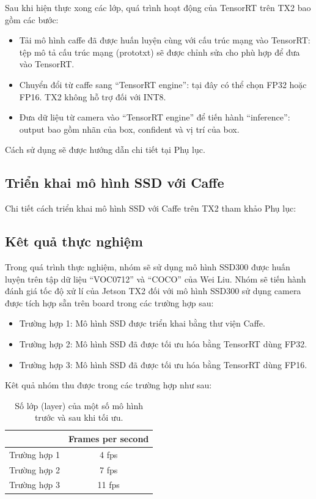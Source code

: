 \documentclass[a4paper]{report}
\begin{document}
Sau khi hiện thực xong các lớp, quá trình hoạt động của TensorRT trên TX2 bao gồm các bước:
\begin{itemize}
	\item Tải mô hình caffe đã được huấn luyện cùng với cấu trúc mạng vào TensorRT: tệp mô tả cấu trúc mạng (prototxt) sẽ được chỉnh sửa cho phù hợp để đưa vào TensorRT. 
	\item Chuyển đổi từ caffe sang “TensorRT engine”: tại đây có thể chọn FP32 hoặc FP16. TX2 không hỗ trợ đối với INT8.
	\item Đưa dữ liệu từ camera vào “TensorRT engine” để tiến hành “inference”: output bao gồm nhãn của box, confident và vị trí của box.
\end{itemize}

Cách sử dụng sẽ được hướng dẫn chi tiết tại Phụ lục.
\subsection{Triển khai mô hình SSD với Caffe}
Chi tiết cách triển khai mô hình SSD với Caffe trên TX2 tham khảo Phụ lục:
\subsection{Kêt quả thực nghiệm}
Trong quá trình thực nghiệm, nhóm sẽ sử dụng mô hình SSD300 được huấn luyện trên tập dữ liệu “VOC0712” và “COCO” của Wei Liu.
Nhóm sẽ tiến hành đánh giá tốc độ xử lí của Jetson TX2 đối với mô hình SSD300 sử dụng camera được tích hợp sẵn trên board trong các trường hợp sau:

\begin{itemize}
	\item Trường hợp 1: Mô hình SSD được triển khai bằng thư viện Caffe.
	\item Trường hợp 2: Mô hình SSD đã được tối ưu hóa bằng TensorRT dùng FP32.
	\item Trường hợp 3: Mô hình SSD đã được tối ưu hóa bằng TensorRT dùng FP16.
\end{itemize}
Kêt quả nhóm thu được trong các trường hợp như sau:
\begin{table}[h!]
	\centering
	\caption{Số lớp (layer) của một số mô hình trước và sau khi tối ưu.}
	\begin{tabular}{|c|c|}
		\hline
		  & Frames per second \\ \hline
		Trường hợp 1 & 4 fps \\ \hline
		Trường hợp 2 & 7 fps \\ \hline
		Trường hợp 3 & 11 fps \\ \hline
	\end{tabular}
\end{table}
\end{document}
